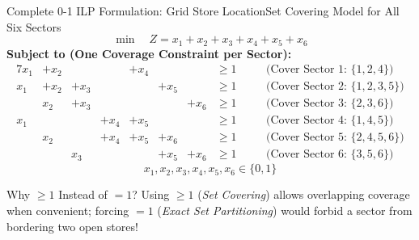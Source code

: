 \documentclass[aspectratio=169]{beamer}
\begin{document}
\begin{frame}{Complete 0-1 ILP Formulation: Grid Store Location}{Set Covering Model for All Six Sectors}
  \footnotesize
  \[
    \min \quad Z = x_1 + x_2 + x_3 + x_4 + x_5 + x_6
  \]
  \textbf{Subject to (One Coverage Constraint per Sector):}
  \begin{alignat*}{7}
    x_1 &+ x_2 &      &      &+ x_4 &      &      &\ge 1 &\quad &\text{(Cover Sector 1: } \{1,2,4\}\text{)} \\
    x_1 &+ x_2 &+ x_3 &      &      &+ x_5 &      &\ge 1 &\quad &\text{(Cover Sector 2: } \{1,2,3,5\}\text{)} \\
        &  x_2 &+ x_3 &      &      &      &+ x_6 &\ge 1 &\quad &\text{(Cover Sector 3: } \{2,3,6\}\text{)} \\
    x_1 &      &      &+ x_4 &+ x_5 &      &      &\ge 1 &\quad &\text{(Cover Sector 4: } \{1,4,5\}\text{)} \\
        &  x_2 &      &+ x_4 &+ x_5 &+ x_6 &      &\ge 1 &\quad &\text{(Cover Sector 5: } \{2,4,5,6\}\text{)} \\
        &      &  x_3 &      &      &+ x_5 &+ x_6 &\ge 1 &\quad &\text{(Cover Sector 6: } \{3,5,6\}\text{)}
  \end{alignat*}
  \[
    x_1, x_2, x_3, x_4, x_5, x_6 \in \{0, 1\}
  \]
  \vspace{-0.4em}
  \begin{block}{Why $\ge 1$ Instead of $= 1$?}
    \scriptsize
    Using $\ge 1$ (\emph{Set Covering}) allows overlapping coverage when convenient; forcing $= 1$ (\emph{Exact Set Partitioning}) would forbid a sector from bordering two open stores!
  \end{block}
\end{frame}
\end{document}
